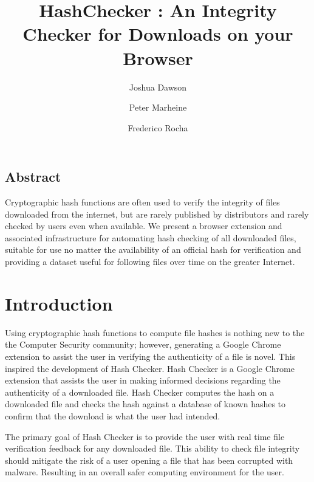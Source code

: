 \documentclass[letterpaper,twocolumn,10pt]{article}
\begin{document}
\date{}

\title{\Large \bf HashChecker : An Integrity Checker for Downloads on your Browser}

\author{
{\rm Joshua Dawson}
\and
{\rm Peter Marheine}
\and
{\rm Frederico Rocha}
}

\maketitle


\subsection*{Abstract}

Cryptographic hash functions are often used to verify the integrity of files downloaded from the internet, but are rarely published by distributors and rarely checked by users even when available. We present a browser extension and associated infrastructure for automating hash checking of all downloaded files, suitable for use no matter the availability of an official hash for verification and providing a dataset useful for following files over time on the greater Internet.

\section{Introduction}

Using cryptographic hash functions to compute file hashes is nothing new to the the Computer Security community; however, generating a Google Chrome extension to assist the user in verifying the authenticity of a file is novel. This inspired the development of Hash Checker. Hash Checker is a Google Chrome extension that assists the user in making informed decisions regarding the authenticity of a downloaded file. Hash Checker computes the hash on a downloaded file and checks the hash against a database of known hashes to confirm that the download is what the user had intended.

The primary goal of Hash Checker is to provide the user with real time file verification feedback for any downloaded file. This ability to check file integrity should mitigate the risk of a user opening a file that has been corrupted with malware. Resulting in an overall safer computing environment for the user.
\end{document}
